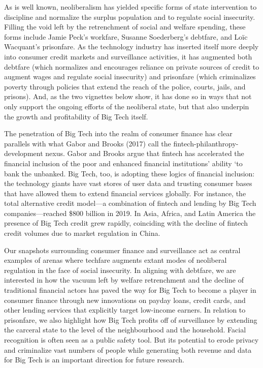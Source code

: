 \documentclass[
]{book}
\begin{document}
As is well known, neoliberalism has yielded specific forms of state intervention to discipline and normalize the surplus population and to regulate social insecurity. Filling the void left by the retrenchment of social and welfare spending, these forms include Jamie Peck's workfare, Susanne Soederberg's debtfare, and Loïc Wacquant's prisonfare. As the technology industry has inserted itself more deeply into consumer credit markets and surveillance activities, it has augmented both debtfare (which normalizes and encourages reliance on private sources of credit to augment wages and regulate social insecurity) and prisonfare (which criminalizes poverty through policies that extend the reach of the police, courts, jails, and prisons). And, as the two vignettes below show, it has done so in ways that not only support the ongoing efforts of the neoliberal state, but that also underpin the growth and profitability of Big Tech itself.

The penetration of Big Tech into the realm of consumer finance has clear parallels with what Gabor and Brooks (2017) call the fintech-philanthropy-development nexus. Gabor and Brooks argue that fintech has accelerated the financial inclusion of the poor and enhanced financial institutions' ability `to bank the unbanked. Big Tech, too, is adopting these logics of financial inclusion: the technology giants have vast stores of user data and trusting consumer bases that have allowed them to extend financial services globally. For instance, the total alternative credit model---a combination of fintech and lending by Big Tech companies---reached \$800 billion in 2019. In Asia, Africa, and Latin America the presence of Big Tech credit grew rapidly, coinciding with the decline of fintech credit volumes due to market regulation in China.

Our snapshots surrounding consumer finance and surveillance act as central examples of arenas where techfare augments extant modes of neoliberal regulation in the face of social insecurity. In aligning with debtfare, we are interested in how the vacuum left by welfare retrenchment and the decline of traditional financial actors has paved the way for Big Tech to become a player in consumer finance through new innovations on payday loans, credit cards, and other lending services that explicitly target low-income earners. In relation to prisonfare, we also highlight how Big Tech profits off of surveillance by extending the carceral state to the level of the neighbourhood and the household. Facial recognition is often seen as a public safety tool. But its potential to erode privacy and criminalize vast numbers of people while generating both revenue and data for Big Tech is an important direction for future research.
\end{document}
